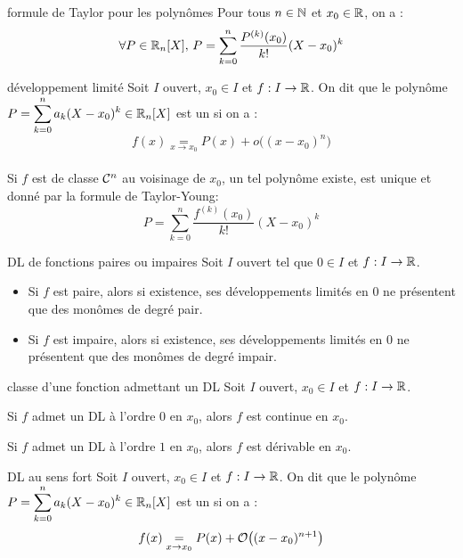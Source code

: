 \begin{adjustwidth}{-3cm}{-3cm}
\begin{proposition}{25.34}{formule de Taylor pour les polynômes}
    Pour tous $n \in \mathbb{N}$ et $x_0 \in \mathbb{R}$, on a :
    $$\forall P \in \mathbb{R}_n[X],\, P = \sum_{k=0}^{n}\frac{P^{(k)}(x_0)}{k!}(X-x_0)^k$$
\end{proposition}

\begin{definition}{25.36}{développement limité}
    Soit $I$ ouvert, $x_0 \in I$ et $f:I \to \mathbb{R}$. On dit que le polynôme $ \displaystyle P = \sum_{k=0}^{n}a_k(X - x_0)^k \in \mathbb{R}_n[X]$ est un  si on a :\\
    $$f(x) \underset{x \to x_0}{=}  P(x) + o\bigl((x-x_0)^n\bigr)$$ \\
    Si $f$ est de classe $\mathcal{C}^{n}$ au voisinage de $x_0$, un tel polynôme existe, est unique et donné par la formule de Taylor-Young:
    $$P = \sum_{k=0}^{n}\frac{f^{(k)}(x_0)}{k!}(X-x_0)^k$$
\end{definition}

\begin{proposition}{25.41}{DL de fonctions paires ou impaires}
    Soit $I$ ouvert tel que $0 \in I$ et $f:I \to \mathbb{R}$. \begin{itemize}
        \item Si $f$ est paire, alors si existence, ses développements limités en 0 ne présentent que des monômes de degré pair.
        \item Si $f$ est impaire, alors si existence, ses développements limités en 0 ne présentent que des monômes de degré impair.
    \end{itemize}
\end{proposition}

\begin{proposition}{25.42}{classe d'une fonction admettant un DL}
    Soit $I$ ouvert, $x_0 \in I$ et $f:I \to \mathbb{R}$.
    \begin{enumeratebf}
        \item Si $f$ admet un DL à l’ordre $0$ en $x_0$, alors $f$ est continue en $x_0$.
        \item Si $f$ admet un DL à l’ordre $1$ en $x_0$, alors $f$ est dérivable en $x_0$.
    \end{enumeratebf}
\end{proposition}

\begin{definition}{25.44}{DL au sens fort}
    Soit $I$ ouvert, $x_0 \in I$ et $f:I \to \mathbb{R}$. On dit que le polynôme $ \displaystyle P = \sum_{k=0}^{n}a_k(X - x_0)^k \in \mathbb{R}_n[X]$ est un  si on a :\\
    $$f(x) \underset{x \to x_0}{=}  P(x) + \mathcal{O}\bigl((x-x_0)^{n+1}\bigr)$$
\end{definition}


\end{adjustwidth}
